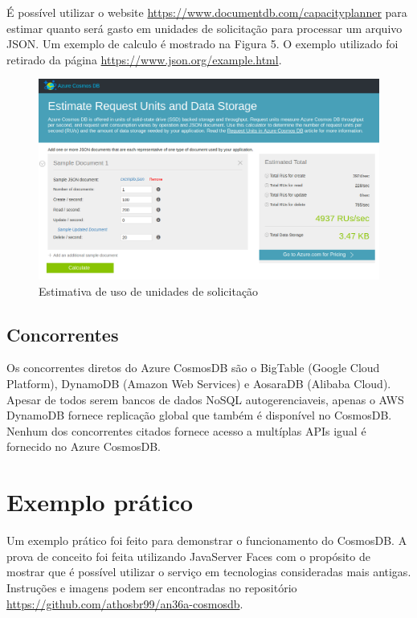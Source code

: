 \documentclass[12pt]{article}
\begin{document}
É possível utilizar o website \url{https://www.documentdb.com/capacityplanner} para estimar quanto será gasto em unidades de solicitação para processar um arquivo JSON. Um exemplo de calculo é mostrado na
Figura 5. O exemplo utilizado foi retirado da página \url{https://www.json.org/example.html}.

\begin{figure}[H]
	\label{fig:az6}
	\caption{Estimativa de uso de unidades de solicitação}
	\includegraphics[scale=0.27]{img/az6.png}
	\centering
\end{figure}

\subsection{Concorrentes}
Os concorrentes diretos do Azure CosmosDB são o BigTable (Google Cloud Platform), DynamoDB (Amazon Web Services) e AosaraDB (Alibaba Cloud). Apesar de todos serem bancos de dados NoSQL autogerenciaveis, apenas o AWS DynamoDB fornece replicação 
global que também é disponível no CosmosDB. Nenhum dos concorrentes citados fornece acesso a multíplas APIs igual é fornecido no Azure CosmosDB.

\section{Exemplo prático}
Um exemplo prático foi feito para demonstrar o funcionamento do CosmosDB. A prova de conceito foi feita utilizando JavaServer Faces com o propósito de mostrar que é possível utilizar o serviço em tecnologias consideradas mais antigas. Instruções e imagens podem
ser encontradas no repositório \url{https://github.com/athosbr99/an36a-cosmosdb}.
\end{document}
